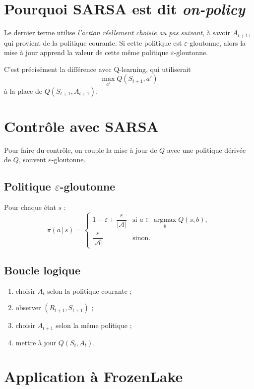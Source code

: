 \documentclass[11pt,a4paper]{article}
\newcommand{\argmax}{\operatorname*{argmax}}
\newcommand{\given}{\,|\,}
\begin{document}
\section{Pourquoi SARSA est dit \emph{on-policy}}

Le dernier terme utilise \emph{l'action réellement choisie au pas suivant}, à savoir $A_{t+1}$, qui provient de la politique courante. Si cette politique est $\varepsilon$-gloutonne, alors la mise à jour apprend la valeur de cette même politique $\varepsilon$-gloutonne.

C'est précisément la différence avec Q-learning, qui utiliserait
\[
\max_{a'}Q(S_{t+1},a')
\]
à la place de $Q(S_{t+1},A_{t+1})$.

\section{Contrôle avec SARSA}

Pour faire du contrôle, on couple la mise à jour de $Q$ avec une politique dérivée de $Q$, souvent $\varepsilon$-gloutonne.

\subsection{Politique $\varepsilon$-gloutonne}

Pour chaque état $s$ :
\[
\pi(a\given s)=
\begin{cases}
1-\varepsilon+\dfrac{\varepsilon}{|\mathcal A|} & \text{si } a\in\argmax_b Q(s,b),\\[0.8em]
\dfrac{\varepsilon}{|\mathcal A|} & \text{sinon.}
\end{cases}
\]

\subsection{Boucle logique}

\begin{enumerate}[leftmargin=1.6em]
    \item choisir $A_t$ selon la politique courante ;
    \item observer $(R_{t+1},S_{t+1})$ ;
    \item choisir $A_{t+1}$ selon la même politique ;
    \item mettre à jour $Q(S_t,A_t)$.
\end{enumerate}

\section{Application à FrozenLake}
\end{document}

